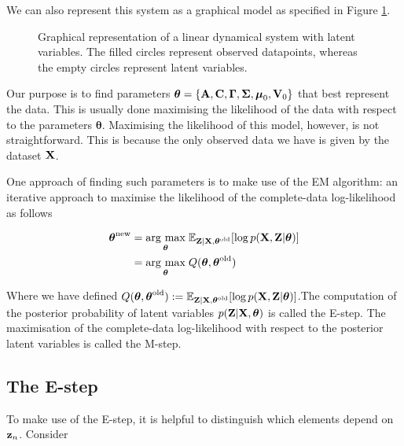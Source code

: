 \documentclass[11pt]{article}
\newcommand{\argmax}[1]{\underset{#1}{\operatorname{arg}\,\operatorname{max}}\;}
\begin{document}
We can also represent this system as a graphical model as specified in Figure \ref{fig:lds-gm}.

\begin{figure}
	\centering
	
	\caption{Graphical representation of a linear dynamical system with latent variables. The filled circles represent observed datapoints, whereas the empty circles represent latent variables.}
	\label{fig:lds-gm}
\end{figure}


Our purpose is to find parameters $\boldsymbol\theta = \{{\bf A}, {\bf C}, \boldsymbol\Gamma, \boldsymbol\Sigma, \boldsymbol\mu_0, {\bf V}_0\}$ that best represent the data. This is usually done maximising the likelihood of the data with respect to the parameters $\boldsymbol{\theta}$. Maximising the likelihood of this model, however, is not straightforward. This is because the only observed data we have is given by the dataset $\bf X$. %


One approach of finding such parameters is to make use of the EM algorithm: an iterative approach to maximise the likelihood of the complete-data log-likelihood as follows

\begin{align}
	\boldsymbol{\theta}^\text{new} &= \argmax{\boldsymbol{\theta}} \mathbb{E}_{{\bf Z}\vert {\bf X}, \boldsymbol{\theta}^\text{old}}[\log p({\bf X}, {\bf Z}\vert \boldsymbol\theta)]\\
	&= \argmax{\boldsymbol{\theta}} Q(\boldsymbol\theta, \boldsymbol\theta^\text{old})
\end{align}

Where we have defined $Q(\boldsymbol\theta, \boldsymbol\theta^\text{old}) := \mathbb{E}_{{\bf Z}\vert {\bf X}, \boldsymbol{\theta}^\text{old}}[\log p({\bf X}, {\bf Z}\vert \boldsymbol\theta)]$.The computation of the posterior probability of latent variables $p({\bf Z}\vert {\bf X}, \boldsymbol\theta)$ is called the E-step. The maximisation of the complete-data log-likelihood with respect to the posterior latent variables is called the M-step.


\subsection{The E-step}
To make use of the E-step, it is helpful to distinguish which elements depend on ${\bf z}_n$. Consider
\end{document}
